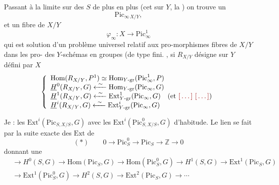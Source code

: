 \documentclass[11pt,a4paper]{article}
\begin{document}
Passant à la limite sur des $S$ de plus en plus  (cet
\ill{}  sur $Y$, \ill{} \ill{} la \ill{}) on trouve un
\ill{} \ill{}
\[
\mathrm{Pic}_{\infty\, X/Y},
\]
\struck{\ill{}} et un \struck{\ill{}}  \ill{} \ill{}
fibre de $X/Y$
\[
\varphi_\infty \colon X \longrightarrow \mathrm{Pic}^{1}_{\infty}
\]
qui est solution d'un problème universel relatif aux pro-morphismes
\ill{} \ill{} fibres de $X/Y$ dans les pro-\ill{}  des
$Y$-schémas en groupes (de type fini. \ill{} \ill{}, si $R_{X/Y}$
\struck{\ill{}} désigne \ill{} \emph{\ill{} \ill{}} sur $Y$ défini par $X$
\[
\left\lbrace
\begin{array}{l}
\mathrm{Hom}(R_{X/Y}, P^{1}) \simeq \mathrm{Hom}_{Y\text{-gr}}(\mathrm{Pic}^{1}_{\infty}, P) \\
\underline{H}^{0}(R_{X/Y}, G) \xleftarrow{\ \sim\ } \mathrm{Hom}_{Y\text{-gr}}(\mathrm{Pic}_{\infty}, G) \\
\underline{H}^{1}(R_{X/Y}, G) \xleftarrow{\ \sim\ } \mathrm{Ext}^{1}_{Y\text{-gr}}(\mathrm{Pic}_{\infty}, G) \quad (\text{et } \ill{}\ \ill{}) \\
\underline{H}^{i}(R_{X/Y}, G) \xleftarrow{\ \sim\ } \mathrm{Ext}^{i}_{Y\text{-gr}}(\mathrm{Pic}_{\infty}, G)
\end{array}\right.
\]

Je  :  les
$\mathrm{Ext}^{i}(\mathrm{Pic}_{S, X/S}, G)$ avec les
$\mathrm{Ext}^{i}(\mathrm{Pic}^{0}_{S, X/S}, G)$ 
 d'habitude. Le lien se fait par la suite
exacte des $\mathrm{Ext}$ \ill{} de
\[
(*) \qquad 0 \to \mathrm{Pic}^{0}_{S} \to \mathrm{Pic}_{S} \to \mathbb{Z} \to 0
\]
donnant une
\[
\begin{aligned}
&\to H^0(S, G) \to \mathrm{Hom}(\mathrm{Pic}_S, G) \to \mathrm{Hom}(\mathrm{Pic}^{0}_{S}, G) \to H^1(S, G) \to \mathrm{Ext}^1(\mathrm{Pic}_S, G) \\
&\to \mathrm{Ext}^1(\mathrm{Pic}^{0}_{S}, G) \to H^2(S, G) \to \mathrm{Ext}^2(\mathrm{Pic}_S, G) \to \cdots
\end{aligned}
\]
\end{document}
